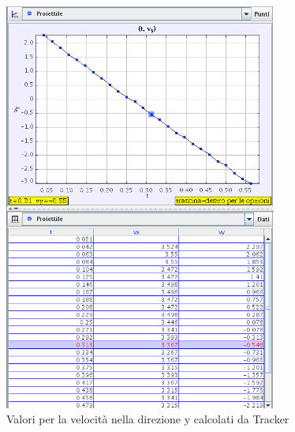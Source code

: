 \documentclass[a4paper,10pt,oneside]{article}
\begin{document}
\begin{figure}[H]
 \centering
 \includegraphics[width=0.8\textwidth]{./immagini/velocita2.png}
 \caption{Valori per la velocità nella direzione y calcolati da Tracker}
 \label{fig:tracker_velocita_verticale}
\end{figure}
\end{document}
